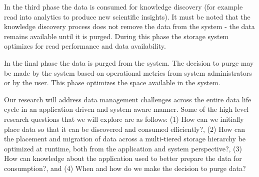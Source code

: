 In the third phase the data is consumed for knowledge discovery (for example
read into analytics to produce new scientific insights). It must be noted
that the knowledge discovery process does not remove the data from the
system - the data remains available until it is purged. During this phase
the storage system optimizes for read performance and data availability. 

In the final phase the data is purged from the system. The
decision to purge may be made by the system based on operational metrics from
system administrators or by the user. This phase optimizes the space available in the
system. %

Our research will address data management challenges across the entire 
data life cycle in an application driven and system aware manner. 
Some of the high level research questions that we will explore are as follows: 
(1) How can we initially place data so that it can be discovered and consumed efficiently?,
(2) How can the placement and migration of data across a multi-tiered storage hierarchy be 
optimized at runtime, both from the application and system perspective?,
(3) How can knowledge about the application used to better prepare the data for consumption?, and 
(4) When and how do we make the decision to purge data?  %





